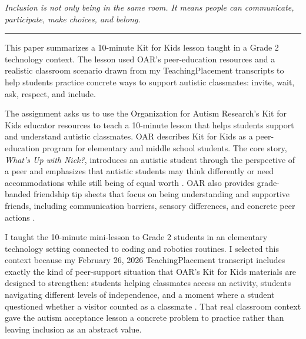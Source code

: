 \documentclass[11pt]{article}
\newcommand{\reviewsection}[1]{\vspace{0.08in}\noindent{\normalsize\bfseries\color{PrimaryRed}#1}\par\vspace{0.02in}}
\begin{document}
\begin{titlepage}
\vfill

\begin{center}
\begin{minipage}{0.92\textwidth}
\centering\itshape
Inclusion is not only being in the same room. It means people can communicate, participate, make choices, and belong.\\
{\color{PrimaryRed}\rule{4.6in}{0.8pt}}
\end{minipage}
\end{center}

\vfill

\begin{center}
\begin{minipage}{0.95\textwidth}
\small
This paper summarizes a 10-minute Kit for Kids lesson taught in a Grade 2 technology context. The lesson used OAR's peer-education resources and a realistic classroom scenario drawn from my TeachingPlacement transcripts to help students practice concrete ways to support autistic classmates: invite, wait, ask, respect, and include.
\end{minipage}
\end{center}

\restoregeometry
\end{titlepage}
\hypersetup{pageanchor=true}

\reviewsection{Lesson Context and Requirement Connection}

The assignment asks us to use the Organization for Autism Research's Kit for Kids educator resources to teach a 10-minute lesson that helps students support and understand autistic classmates. OAR describes Kit for Kids as a peer-education program for elementary and middle school students. The core story, \textit{What's Up with Nick?}, introduces an autistic student through the perspective of a peer and emphasizes that autistic students may think differently or need accommodations while still being of equal worth \citep{oar2026kit,oar2026nick}. OAR also provides grade-banded friendship tip sheets that focus on being understanding and supportive friends, including communication barriers, sensory differences, and concrete peer actions \citep{oar2026tips}.

I taught the 10-minute mini-lesson to Grade 2 students in an elementary technology setting connected to coding and robotics routines. I selected this context because my February 26, 2026 TeachingPlacement transcript includes exactly the kind of peer-support situation that OAR's Kit for Kids materials are designed to strengthen: students helping classmates access an activity, students navigating different levels of independence, and a moment where a student questioned whether a visitor counted as a classmate \citep{placement2026robotics}. That real classroom context gave the autism acceptance lesson a concrete problem to practice rather than leaving inclusion as an abstract value.
\end{document}
